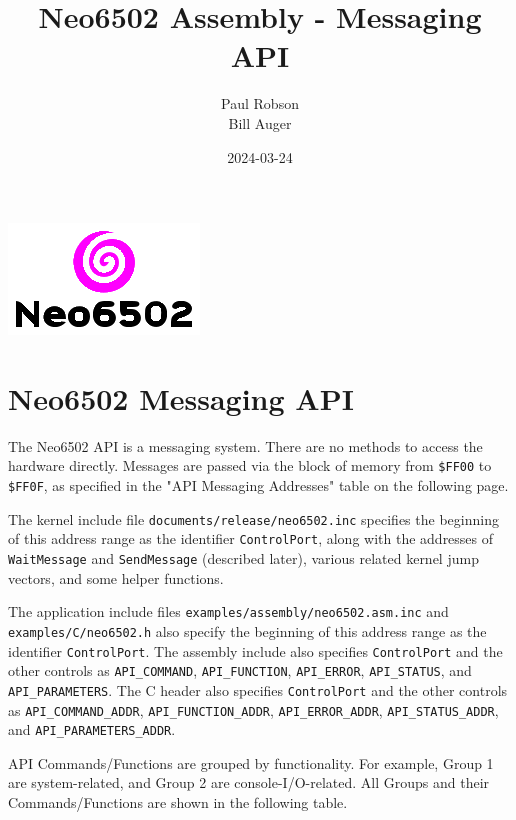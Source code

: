 \documentclass[12pt]{article}
\title{Neo6502 Assembly - Messaging API}
\author{Paul Robson \\ Bill Auger}
\date{2024-03-24}
\newcommand{\MonoSp}[1] {\fontsize{10pt}{10pt}\selectfont\texttt{#1}\normalsize}
\begin{document}
\maketitle

\begin{center}
  \includegraphics[scale=2.0]{neo6502-text-logo.png}
\end{center}

\tableofcontents


\pagebreak


\section{Neo6502 Messaging API}\label{api}

The Neo6502 API is a messaging system.
There are no methods to access the hardware directly.
Messages are passed via the block of memory from \MonoSp{\$FF00} to \MonoSp{\$FF0F},
as specified in the "API Messaging Addresses" table on the following page.
\newline

The kernel include file \MonoSp{documents/release/neo6502.inc}
specifies the beginning of this address range as the identifier \MonoSp{ControlPort},
along with the addresses of \MonoSp{WaitMessage} and \MonoSp{SendMessage} (described later),
various related kernel jump vectors, and some helper functions.
\newline

The application include files \MonoSp{examples/assembly/neo6502.asm.inc}
and \MonoSp{examples/C/neo6502.h}
also specify the beginning of this address range as the identifier \MonoSp{ControlPort}.
The assembly include also specifies \MonoSp{ControlPort} and the other controls as
\MonoSp{API\_COMMAND}, \MonoSp{API\_FUNCTION}, \MonoSp{API\_ERROR},
\MonoSp{API\_STATUS}, and \MonoSp{API\_PARAMETERS}.
The C header also specifies \MonoSp{ControlPort} and the other controls as
\MonoSp{API\_COMMAND\_ADDR}, \MonoSp{API\_FUNCTION\_ADDR},
\MonoSp{API\_ERROR\_ADDR}, \MonoSp{API\_STATUS\_ADDR},
and \MonoSp{API\_PARAMETERS\_ADDR}.
\newline

API Commands/Functions are grouped by functionality.
For example, Group 1 are system-related, and Group 2 are console-I/O-related.
All Groups and their Commands/Functions are shown in the following table.
\newline
\end{document}
